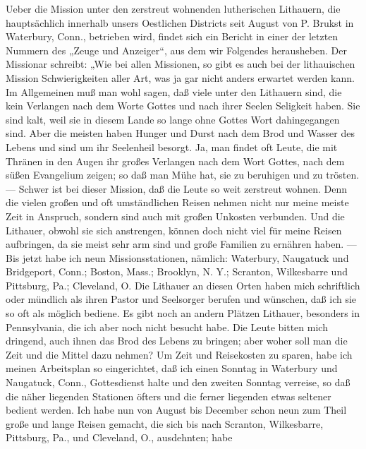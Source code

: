 Ueber die Mission unter den zerstreut wohnenden lutherischen Lithauern, die hauptsächlich innerhalb unsers Oestlichen Districts seit August von P. Brukst in Waterbury, Conn., betrieben wird, findet sich ein Bericht in einer der letzten Nummern des „Zeuge und Anzeiger“, aus dem wir Folgendes herausheben. Der Missionar schreibt: „Wie bei allen Missionen, so gibt es auch bei der lithauischen Mission Schwierigkeiten aller Art, was ja gar nicht anders erwartet werden kann. Im Allgemeinen muß man wohl sagen, daß viele unter den Lithauern sind, die kein Verlangen nach dem Worte Gottes und nach ihrer Seelen Seligkeit haben. Sie sind kalt, weil sie in diesem Lande so lange ohne Gottes Wort dahingegangen sind. Aber die meisten haben Hunger und Durst nach dem Brod und Wasser des Lebens und sind um ihr Seelenheil besorgt. Ja, man findet oft Leute, die mit Thränen in den Augen ihr großes Verlangen nach dem Wort Gottes, nach dem süßen Evangelium zeigen; so daß man Mühe hat, sie zu beruhigen und zu trösten. — Schwer ist bei dieser Mission, daß die Leute so weit zerstreut wohnen. Denn die vielen großen und oft umständlichen Reisen nehmen nicht nur meine meiste Zeit in Anspruch, sondern sind auch mit großen Unkosten verbunden. Und die Lithauer, obwohl sie sich anstrengen, können doch nicht viel für meine Reisen aufbringen, da sie meist sehr arm sind und große Familien zu ernähren haben. — Bis jetzt habe ich neun Missionsstationen, nämlich: Waterbury, Naugatuck und Bridgeport, Conn.; Boston, Mass.; Brooklyn, N. Y.; Scranton, Wilkesbarre und Pittsburg, Pa.; Cleveland, O. Die Lithauer an diesen Orten haben mich schriftlich oder mündlich als ihren Pastor und Seelsorger berufen und wünschen, daß ich sie so oft als möglich bediene. Es gibt noch an andern Plätzen Lithauer, besonders in Pennsylvania, die ich aber noch nicht besucht habe. Die Leute bitten mich dringend, auch ihnen das Brod des Lebens zu bringen; aber woher soll man die Zeit und die Mittel dazu nehmen? Um Zeit und Reisekosten zu sparen, habe ich meinen Arbeitsplan so eingerichtet, daß ich einen Sonntag in Waterbury und Naugatuck, Conn., Gottesdienst halte und den zweiten Sonntag verreise, so daß die näher liegenden Stationen öfters und die ferner liegenden etwas seltener bedient werden. Ich habe nun von August bis December schon neun zum Theil große und lange Reisen gemacht, die sich bis nach Scranton, Wilkesbarre, Pittsburg, Pa., und Cleveland, O., ausdehnten; habe
